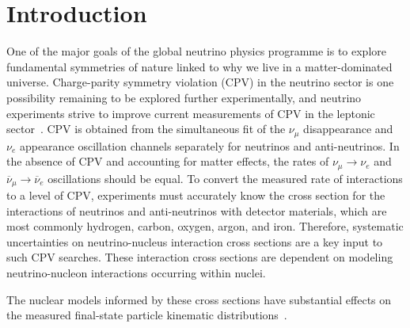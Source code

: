 \section{Introduction}
One of the major goals of the global neutrino physics programme is to explore fundamental symmetries of nature linked to why we live in a matter-dominated universe. 
Charge-parity symmetry violation (CPV) in the neutrino sector is one possibility remaining to be explored further experimentally, and neutrino experiments strive to improve current measurements of CPV in the leptonic sector~\cite{Abe:2019vii}. 
CPV is obtained from the simultaneous fit of the $\nu_{\mu}$ disappearance and $\nu_e$ appearance oscillation channels separately for neutrinos and anti-neutrinos.
In the absence of CPV and accounting for matter effects, the rates of $\nu_{\mu}\!\rightarrow\!\nu_e$ and $\overline{\nu}_{\mu}\!\rightarrow\!\overline{\nu}_e$ oscillations should be equal.
To convert the measured rate of interactions to a level of CPV, experiments must accurately know the cross section for the interactions of neutrinos and anti-neutrinos with detector materials, which are most commonly hydrogen, carbon, oxygen, argon, and iron. 
Therefore, systematic uncertainties on neutrino-nucleus interaction cross sections are a key input to such CPV searches.  
These interaction cross sections are dependent on modeling neutrino-nucleon interactions occurring within nuclei. 

The nuclear models informed by these cross sections have substantial effects on the measured final-state particle kinematic distributions~\cite{Mosel:2016cwa}.

